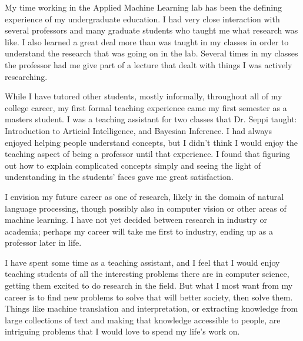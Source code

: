 \documentclass[onecolumn, 12pt]{article}
\begin{document}
My time working in the Applied Machine Learning lab has been the defining
experience of my undergraduate education.  I had very close interaction with
several professors and many graduate students who taught me what research was
like.  I also learned a great deal more than was taught in my classes in order
to understand the research that was going on in the lab.  Several times in my
classes the professor had me give part of a lecture that dealt with things I
was actively researching.  

While I have tutored other students, mostly informally, throughout all of my
college career, my first formal teaching experience came my first semester as a
masters student.  I was a teaching assistant for two classes that Dr. Seppi
taught: Introduction to Articial Intelligence, and Bayesian Inference.  I had
always enjoyed helping people understand concepts, but I didn't think I would
enjoy the teaching aspect of being a professor until that experience.  I found
that figuring out how to explain complicated concepts simply and seeing the
light of understanding in the students' faces gave me great satisfaction.

I envision my future career as one of research, likely in the domain of natural
language processing, though possibly also in computer vision or other areas of
machine learning.  I have not yet decided between research in industry or
academia; perhaps my career will take me first to industry, ending up as a
professor later in life.

I have spent some time as a teaching assistant, and I
feel that I would enjoy teaching students of all the interesting problems there
are in computer science, getting them excited to do research in the field.  But
what I most want from my career is to find new problems to solve that will
better society, then solve them.  Things like machine translation and
interpretation, or extracting knowledge from large collections of text and
making that knowledge accessible to people, are intriguing problems that I
would love to spend my life's work on.
\end{document}
